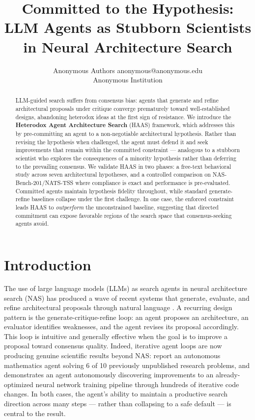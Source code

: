\documentclass[10pt]{article}
\title{Committed to the Hypothesis: LLM Agents as Stubborn Scientists\\
       in Neural Architecture Search}
\author{\name Anonymous Authors \email anonymous@anonymous.edu \\
      \addr Anonymous Institution}
\newcommand{\haas}{\textsc{HAAS}}
\newcommand{\nasbench}{NAS-Bench-201}
\begin{document}
\maketitle

\begin{abstract}
LLM-guided search suffers from consensus bias: agents that generate and refine
architectural proposals under critique converge prematurely toward well-established
designs, abandoning heterodox ideas at the first sign of resistance. We introduce
the \textbf{Heterodox Agent Architecture Search} (\haas{}) framework, which
addresses this by pre-committing an agent to a non-negotiable architectural
hypothesis. Rather than revising the hypothesis when challenged, the agent must
defend it and seek improvements that remain within the committed constraint ---
analogous to a stubborn scientist who explores the consequences of a minority
hypothesis rather than deferring to the prevailing consensus. We validate
\haas{} in two phases: a free-text behavioral study across seven architectural
hypotheses, and a controlled comparison on \nasbench{}/NATS-TSS where
compliance is exact and performance is pre-evaluated. Committed agents
maintain hypothesis fidelity throughout, while standard generate-refine
baselines collapse under the first challenge. In one case, the enforced
constraint leads \haas{} to \emph{outperform} the unconstrained baseline,
suggesting that directed commitment can expose favorable regions of the
search space that consensus-seeking agents avoid.
\end{abstract}

\section{Introduction}
\label{sec:intro}

The use of large language models (LLMs) as search agents in neural architecture
search (NAS) has produced a wave of recent systems that generate, evaluate, and
refine architectural proposals through natural language
\citep{zheng2023can,nasir2024llmatic}. A recurring design pattern is the
generate-critique-refine loop: an agent proposes an architecture, an evaluator
identifies weaknesses, and the agent revises its proposal accordingly. This loop
is intuitive and generally effective when the goal is to improve a proposal
toward consensus quality. Indeed, iterative agent loops are now producing
genuine scientific results beyond NAS: \citet{feng2026aletheia} report an
autonomous mathematics agent solving 6 of 10 previously unpublished research
problems, and \citet{karpathy2026autoresearch} demonstrates an agent
autonomously discovering improvements to an already-optimized neural network
training pipeline through hundreds of iterative code changes. In both cases,
the agent's ability to maintain a productive search direction across many steps
--- rather than collapsing to a safe default --- is central to the result.
\end{document}
